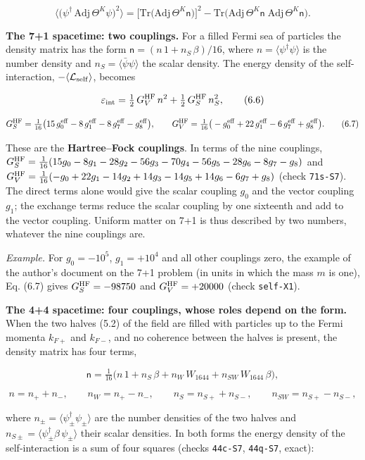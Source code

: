 \documentclass[
  10pt,
]{article}
\begin{document}
\[\big\langle\big(\psi^\dagger\,\mathrm{Adj}\,\Theta^K\psi\big)^2\big\rangle
=\big[\mathrm{Tr}\big(\mathrm{Adj}\,\Theta^K\mathsf n\big)\big]^2-\mathrm{Tr}\big(\mathrm{Adj}\,\Theta^K\mathsf n\;\mathrm{Adj}\,\Theta^K\mathsf n\big).\]

\textbf{The 7+1 spacetime: two couplings.} For a filled Fermi sea of
particles the density matrix has the form
\(\mathsf n=(n\,1+n_S\,\beta)/16\), where
\(n=\langle\psi^\dagger\psi\rangle\) is the number density and
\(n_S=\langle\bar\psi\psi\rangle\) the scalar density. The energy
density of the self-interaction,
\(-\langle\mathcal L_{\rm self}\rangle\), becomes

\[\varepsilon_{\rm int}=\tfrac12\,G_V^{\rm HF}\,n^2+\tfrac12\,G_S^{\rm HF}\,n_S^2,\tag{6.6}\]

\[G_S^{\rm HF}=\tfrac1{16}\big(15\,g_0^{\rm eff}-8\,g_1^{\rm eff}-8\,g_7^{\rm eff}-g_8^{\rm eff}\big),\qquad
G_V^{\rm HF}=\tfrac1{16}\big(-g_0^{\rm eff}+22\,g_1^{\rm eff}-6\,g_7^{\rm eff}+g_8^{\rm eff}\big).\tag{6.7}\]

These are the \textbf{Hartree--Fock couplings}. In terms of the nine
couplings,
\(G_S^{\rm HF}=\tfrac1{16}(15g_0-8g_1-28g_2-56g_3-70g_4-56g_5-28g_6-8g_7-g_8)\)
and
\(G_V^{\rm HF}=\tfrac1{16}(-g_0+22g_1-14g_2+14g_3-14g_5+14g_6-6g_7+g_8)\)
(check \texttt{71s-S7}). The direct terms alone would give the scalar
coupling \(g_0\) and the vector coupling \(g_1\); the exchange terms
reduce the scalar coupling by one sixteenth and add to the vector
coupling. Uniform matter on 7+1 is thus described by two numbers,
whatever the nine couplings are.

\emph{Example.} For \(g_0=-10^5\), \(g_1=+10^4\) and all other couplings
zero, the example of the author's document on the 7+1 problem (in units
in which the mass \(m\) is one), Eq. (6.7) gives \(G_S^{\rm HF}=-98750\)
and \(G_V^{\rm HF}=+20000\) (check \texttt{self-X1}).

\textbf{The 4+4 spacetime: four couplings, whose roles depend on the
form.} When the two halves (5.2) of the field are filled with particles
up to the Fermi momenta \(k_{F+}\) and \(k_{F-}\), and no coherence
between the halves is present, the density matrix has four terms,

\[\mathsf n=\tfrac1{16}\big(n\,1+n_S\,\beta+n_W\,W_{1644}+n_{SW}\,W_{1644}\,\beta\big),\tag{6.8}\]

\[n=n_++n_-,\qquad n_W=n_+-n_-,\qquad n_S=n_{S+}+n_{S-},\qquad n_{SW}=n_{S+}-n_{S-},\]

where \(n_\pm=\langle\psi_\pm^\dagger\psi_\pm\rangle\) are the number
densities of the two halves and
\(n_{S\pm}=\langle\psi_\pm^\dagger\beta\,\psi_\pm\rangle\) their scalar
densities. In both forms the energy density of the self-interaction is a
sum of four squares (checks \texttt{44c-S7}, \texttt{44q-S7}, exact):
\end{document}
